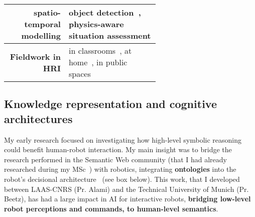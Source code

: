 \begin{table}[h!]
\begin{tabular}{rp{0.6\linewidth}}
        spatio-temporal modelling & \small object
        detection~\cite{wallbridge2017qualitative}, physics-aware situation
        assessment\cite{lemaignan2018underworlds,sallami2019simulation} \\
        \midrule
        \textbf{Fieldwork in HRI} & \small in
        classrooms~\cite{hood2015when, lemaignan2016learning, jacq2016building,
        baxter2015wider,kennedy2016cautious,senft2018robots}, at
        home~\cite{mondada2015ranger}, in public spaces~\cite{winkle2020insitu}\\
        \bottomrule
    \end{tabular}
    \label{pi-expertise}
\end{table}


\subsection{Knowledge representation and cognitive architectures}

My early research focused on investigating how high-level symbolic reasoning
could benefit human-robot interaction. My main insight was to bridge the
research performed in the Semantic Web community (that I had already researched
during my MSc~\cite{lemaignan2006mason}) with robotics, integrating
\textbf{ontologies} into the robot's decisional
architecture~\cite{lemaignan2010oro} (see box below). This work, that I
developed between LAAS-CNRS (Pr. Alami) and the Technical University of
Munich (Pr. Beetz), has had a large impact in AI for interactive robots,
\textbf{bridging low-level robot perceptions and commands, to human-level
semantics}.



